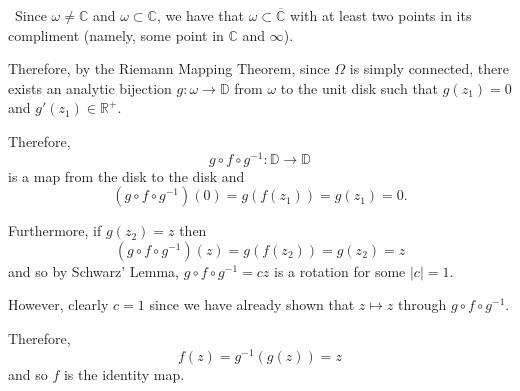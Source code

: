 \documentclass[12pt]{Qual}
\begin{document}
\begin{solution}$\,$
Since $\omega\not=\mathbb{C}$ and $\omega\subset\mathbb{C}$, we have that $\omega\subset\overline{\mathbb{C}}$ with at least two points in its compliment (namely, some point in $\mathbb{C}$ and $\infty$).

Therefore, by the Riemann Mapping Theorem, since $\Omega$ is simply connected, there exists an analytic bijection $g:\omega\to\mathbb{D}$ from $\omega$ to the unit disk such that $g(z_1)=0$ and $g'(z_1)\in\mathbb{R}^+.$

Therefore, $$g\circ f\circ g^{-1}:\mathbb{D}\to\mathbb{D}$$ is a map from the disk to the disk and $$(g\circ f\circ g^{-1})(0)=g(f(z_1))=g(z_1)=0.$$

Furthermore, if $g(z_2)=z$ then $$(g\circ f\circ g^{-1})(z)=g(f(z_2))=g(z_2)=z$$ and so by Schwarz' Lemma, $g\circ f\circ g^{-1}=cz$ is a rotation for some $|c|=1$.

However, clearly $c=1$ since we have already shown that $z\mapsto z$ through $g\circ f\circ g^{-1}$.

Therefore, $$f(z)=g^{-1}(g(z))=z$$ and so $f$ is the identity map.
\end{solution}
\end{document}
